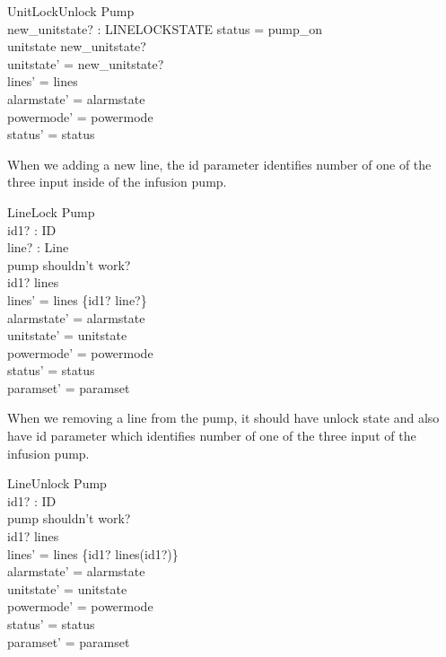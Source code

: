 \documentclass{article}
\begin{document}
    \begin{schema}{UnitLockUnlock}
		\Delta Pump \\
		new\_unitstate? : LINELOCKSTATE
	\where
		status = pump\_on \\ 
		unitstate \neq new\_unitstate? \\
		unitstate' = new\_unitstate? \\
    	lines' = lines  \\
    	alarmstate' = alarmstate \\
    	powermode' = powermode \\
    	status' = status \\	
	\end{schema}
	
	When we adding a new line, the id parameter identifies number of 
	one of the three input inside of the infusion pump.	
	
    \begin{schema}{LineLock}
		\Delta Pump \\
		id1? : ID \\
		line? : Line \\
	\where
	    pump shouldn't work? \\
		id1? \notin \dom lines \\
    	lines' = lines \cup \{id1? \mapsto line?\} \\
    	alarmstate' = alarmstate \\
    	unitstate' = unitstate \\
    	powermode' = powermode \\
    	status' = status \\
    	paramset' = paramset
	\end{schema} 	

	
	When we removing a line from the pump, it should have unlock state
	and also have id parameter which identifies number of one of the
	three input of the infusion pump.

	\begin{schema}{LineUnlock}
		\Delta Pump \\
		id1? : ID \\
	\where
		pump shouldn't work? \\
		id1? \in \dom lines \\
		lines' = lines \setminus \{id1? \mapsto lines(id1?)\} \\
    	alarmstate' = alarmstate \\
    	unitstate' = unitstate \\
    	powermode' = powermode \\
    	status' = status \\
    	paramset' = paramset
	\end{schema}
\end{document}
